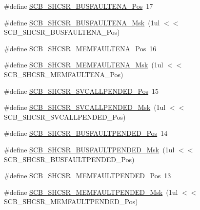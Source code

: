 \begin{DoxyCompactItemize}
\#define \hyperlink{group___c_m_s_i_s___c_m3___s_c_b_ga3d32edbe4a5c0335f808cfc19ec7e844}{S\-C\-B\-\_\-\-S\-H\-C\-S\-R\-\_\-\-B\-U\-S\-F\-A\-U\-L\-T\-E\-N\-A\-\_\-\-Pos}~17
\item 
\#define \hyperlink{group___c_m_s_i_s___c_m3___s_c_b_ga43e8cbe619c9980e0d1aacc85d9b9e47}{S\-C\-B\-\_\-\-S\-H\-C\-S\-R\-\_\-\-B\-U\-S\-F\-A\-U\-L\-T\-E\-N\-A\-\_\-\-Msk}~(1ul $<$$<$ S\-C\-B\-\_\-\-S\-H\-C\-S\-R\-\_\-\-B\-U\-S\-F\-A\-U\-L\-T\-E\-N\-A\-\_\-\-Pos)
\item 
\#define \hyperlink{group___c_m_s_i_s___c_m3___s_c_b_ga685b4564a8760b4506f14ec4307b7251}{S\-C\-B\-\_\-\-S\-H\-C\-S\-R\-\_\-\-M\-E\-M\-F\-A\-U\-L\-T\-E\-N\-A\-\_\-\-Pos}~16
\item 
\#define \hyperlink{group___c_m_s_i_s___c_m3___s_c_b_gaf084424fa1f69bea36a1c44899d83d17}{S\-C\-B\-\_\-\-S\-H\-C\-S\-R\-\_\-\-M\-E\-M\-F\-A\-U\-L\-T\-E\-N\-A\-\_\-\-Msk}~(1ul $<$$<$ S\-C\-B\-\_\-\-S\-H\-C\-S\-R\-\_\-\-M\-E\-M\-F\-A\-U\-L\-T\-E\-N\-A\-\_\-\-Pos)
\item 
\#define \hyperlink{group___c_m_s_i_s___c_m3___s_c_b_ga2f93ec9b243f94cdd3e94b8f0bf43641}{S\-C\-B\-\_\-\-S\-H\-C\-S\-R\-\_\-\-S\-V\-C\-A\-L\-L\-P\-E\-N\-D\-E\-D\-\_\-\-Pos}~15
\item 
\#define \hyperlink{group___c_m_s_i_s___c_m3___s_c_b_ga6095a7acfbad66f52822b1392be88652}{S\-C\-B\-\_\-\-S\-H\-C\-S\-R\-\_\-\-S\-V\-C\-A\-L\-L\-P\-E\-N\-D\-E\-D\-\_\-\-Msk}~(1ul $<$$<$ S\-C\-B\-\_\-\-S\-H\-C\-S\-R\-\_\-\-S\-V\-C\-A\-L\-L\-P\-E\-N\-D\-E\-D\-\_\-\-Pos)
\item 
\#define \hyperlink{group___c_m_s_i_s___c_m3___s_c_b_gaa22551e24a72b65f1e817f7ab462203b}{S\-C\-B\-\_\-\-S\-H\-C\-S\-R\-\_\-\-B\-U\-S\-F\-A\-U\-L\-T\-P\-E\-N\-D\-E\-D\-\_\-\-Pos}~14
\item 
\#define \hyperlink{group___c_m_s_i_s___c_m3___s_c_b_ga677c23749c4d348f30fb471d1223e783}{S\-C\-B\-\_\-\-S\-H\-C\-S\-R\-\_\-\-B\-U\-S\-F\-A\-U\-L\-T\-P\-E\-N\-D\-E\-D\-\_\-\-Msk}~(1ul $<$$<$ S\-C\-B\-\_\-\-S\-H\-C\-S\-R\-\_\-\-B\-U\-S\-F\-A\-U\-L\-T\-P\-E\-N\-D\-E\-D\-\_\-\-Pos)
\item 
\#define \hyperlink{group___c_m_s_i_s___c_m3___s_c_b_gaceb60fe2d8a8cb17fcd1c1f6b5aa924f}{S\-C\-B\-\_\-\-S\-H\-C\-S\-R\-\_\-\-M\-E\-M\-F\-A\-U\-L\-T\-P\-E\-N\-D\-E\-D\-\_\-\-Pos}~13
\item 
\#define \hyperlink{group___c_m_s_i_s___c_m3___s_c_b_ga9abc6c2e395f9e5af4ce05fc420fb04c}{S\-C\-B\-\_\-\-S\-H\-C\-S\-R\-\_\-\-M\-E\-M\-F\-A\-U\-L\-T\-P\-E\-N\-D\-E\-D\-\_\-\-Msk}~(1ul $<$$<$ S\-C\-B\-\_\-\-S\-H\-C\-S\-R\-\_\-\-M\-E\-M\-F\-A\-U\-L\-T\-P\-E\-N\-D\-E\-D\-\_\-\-Pos)
$$
\end{DoxyCompactItemize}
